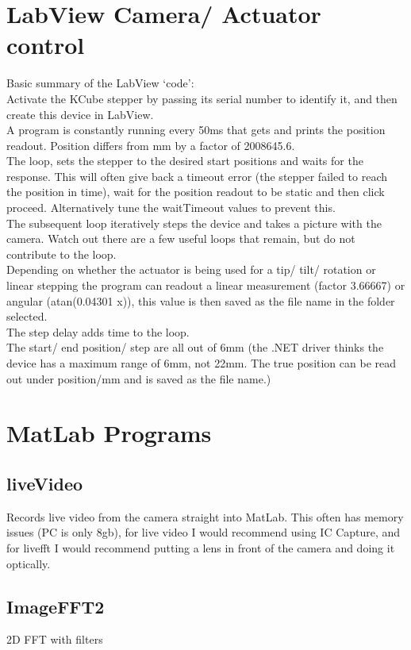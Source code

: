 \documentclass[]{report}
\begin{document}
\section*{LabView Camera/ Actuator control}
Basic summary of the LabView `code':\\
Activate the KCube stepper by passing its serial number to identify it, and then create this device in LabView.\\
A program is constantly running every 50ms that gets and prints the position readout. Position differs from mm by a factor of 2008645.6.\\
The loop, sets the stepper to the desired start positions and waits for the response. This will often give back a timeout error (the stepper failed to reach the position in time), wait for the position readout to be static and then click proceed. Alternatively tune the waitTimeout values to prevent this.\\
The subsequent loop iteratively steps the device and takes a picture with the camera. Watch out there are a few useful loops that remain, but do not contribute to the loop.\\
Depending on whether the actuator is being used for a tip/ tilt/ rotation or linear stepping the program can readout a linear measurement (factor 3.66667) or angular (atan(0.04301 x)), this value is then saved as the file name in the folder selected.\\
The step delay adds time to the loop.\\
The start/ end position/ step are all out of 6mm (the .NET driver thinks the device has a maximum range of 6mm, not 22mm. The true position can be read out under position/mm and is saved as the file name.)\\

\section*{MatLab Programs}
\subsection*{liveVideo}
Records live video from the camera straight into MatLab. This often has memory issues (PC is only 8gb), for live video I would recommend using IC Capture, and for livefft I would recommend putting a lens in front of the camera and doing it optically.\\
\subsection*{ImageFFT2}
2D FFT with filters
\end{document}
